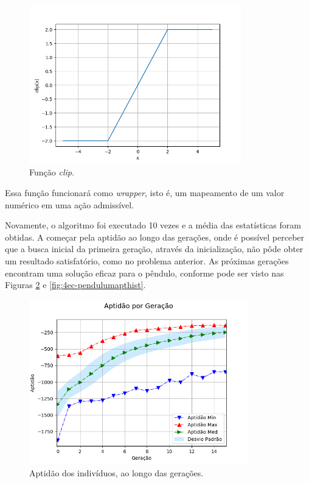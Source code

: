 \begin{figure}[H]
	\centering
	\includegraphics[width=0.82\textwidth]{02_desenvolvimento/04_EC_Fig_PendulumClipFun.png}
	\caption{Função \textit{clip}.}
	\label{fig:4ec-pendulumclip}
\end{figure}

Essa função funcionará como \textit{wrapper}, isto é, um mapeamento de um valor numérico em uma ação admissível.

Novamente, o algoritmo foi executado 10 vezes e a média das estatísticas foram obtidas. A começar pela aptidão ao longo das gerações, onde é possível perceber que a busca inicial da primeira geração, através da inicialização, não pôde obter um resultado satisfatório, como no problema anterior. As próximas gerações encontram uma solução eficaz para o pêndulo, conforme pode ser visto nas Figuras \ref{fig:4ec-pendulumaptger} e \ref{fig:4ec-pendulumapthist}.

\begin{figure}[H]
	\centering
	\includegraphics[width=0.85\textwidth]{02_desenvolvimento/04_EC_Fig_PendulumAptGer.png}
	\caption{Aptidão dos indivíduos, ao longo das gerações.}
	\label{fig:4ec-pendulumaptger}
\end{figure}

